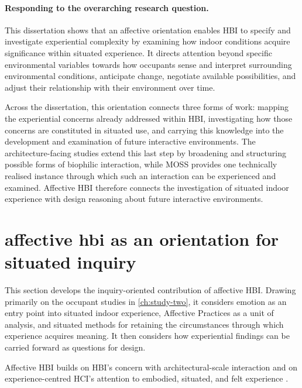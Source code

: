\paragraph{Responding to the overarching research question.}

This dissertation shows that an affective orientation enables HBI to
specify and investigate experiential complexity by examining how indoor
conditions acquire significance within situated experience. It directs
attention beyond specific environmental variables towards how
occupants sense and interpret surrounding environmental conditions, anticipate change, negotiate available possibilities, and adjust their relationship with their environment over time.

Across the dissertation, this orientation connects three forms of work:
mapping the experiential concerns already addressed within HBI,
investigating how those concerns are constituted in situated use, and
carrying this knowledge into the development and examination of future
interactive environments. The architecture-facing studies extend this
last step by broadening and structuring possible forms of biophilic
interaction, while MOSS provides one technically realised instance
through which such an interaction can be experienced and examined.
Affective HBI therefore connects the investigation of situated indoor
experience with design reasoning about future interactive environments.



\section{affective hbi as an orientation for situated inquiry}
\label{sec:affect-contribution}
This section develops the inquiry-oriented contribution of affective
HBI. Drawing primarily on the occupant studies in
\autoref{ch:study-two}, it considers emotion as an entry point
into situated indoor experience, Affective Practices as a unit of
analysis, and situated methods for retaining the circumstances through
which experience acquires meaning. It then considers how experiential
findings can be carried forward as questions for design.

Affective HBI builds on HBI's concern with architectural-scale interaction
\cite{alavi2019introduction, alavi2018artifacts, alavi2017comfort,
wiberg2008environment, wiberg2020interaction} and on experience-centred HCI's attention to embodied, situated, and felt experience
\cite{dourish2001action,mccarthy2004technology,hook2018designing}.

